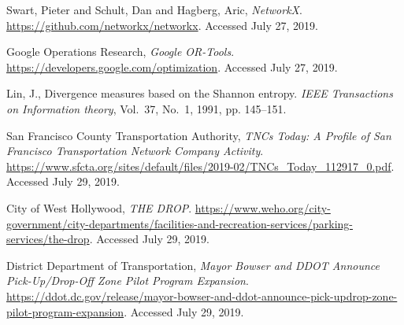 \documentclass[]{trbunofficial_bdit_final}
\begin{document}
\begin{thebibliography}{33}
{Swart, Pieter and Schult, Dan and Hagberg, Aric}, \emph{{NetworkX}}.
  \url{https://github.com/networkx/networkx}. Accessed July 27, 2019.

{Google Operations Research}, \emph{{Google OR-Tools}}.
  \url{https://developers.google.com/optimization}. Accessed July 27, 2019.

Lin, J., Divergence measures based on the Shannon entropy. \emph{IEEE
  Transactions on Information theory}, Vol.~37, No.~1, 1991, pp. 145--151.

{San Francisco County Transportation Authority}, \emph{TNCs Today: A Profile of
  San Francisco Transportation Network Company Activity}.
  \url{https://www.sfcta.org/sites/default/files/2019-02/TNCs_Today_112917_0.pdf}.
  Accessed July 29, 2019.

{City of West Hollywood}, \emph{THE DROP}.
  \url{https://www.weho.org/city-government/city-departments/facilities-and-recreation-services/parking-services/the-drop}.
  Accessed July 29, 2019.

{District Department of Transportation}, \emph{Mayor Bowser and DDOT Announce
  Pick-Up/Drop-Off Zone Pilot Program Expansion}.
  \url{https://ddot.dc.gov/release/mayor-bowser-and-ddot-announce-pick-updrop-zone-pilot-program-expansion}.
  Accessed July 29, 2019.

\end{thebibliography}
\end{document}
